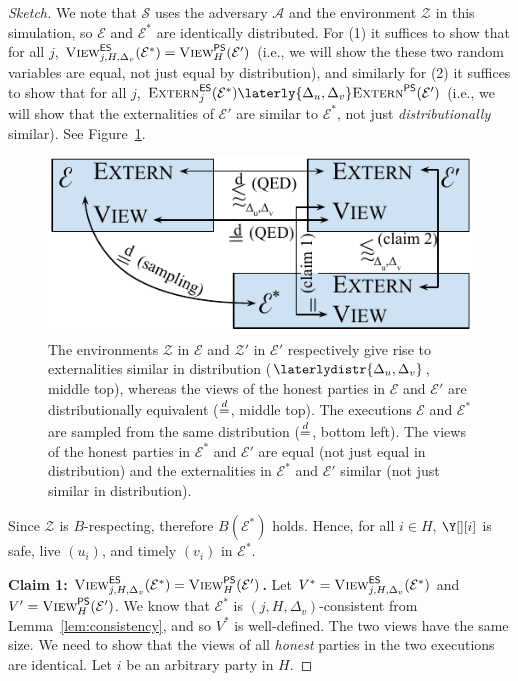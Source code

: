 \begin{proof}[Sketch]

  We note that $\mathcal{S}$ uses the adversary $\mathcal{A}$ and the
  environment $\mathcal{Z}$ in this simulation, so $\mathcal{E}$
  and $\mathcal{E}^*$ are identically distributed.
  For (1) it suffices to show that for all $j$,
  $\textsc{View}^{\textsf{ES}}_{j,H,\Delta_v}(\mathcal{E}^*) = \textsc{View}^{\textsf{PS}}_H(\mathcal{E}')$
  (i.e., we will show the these two random variables are equal,
  not just equal by distribution),
  and similarly for (2) it suffices to show that for all $j$,
  $\LCExtern_j(\mathcal{E}^*) \laterly{\Delta_u,\Delta_v} \PEExtern(\mathcal{E}')$
  (i.e., we will show that the externalities of $\mathcal{E}'$ are
  similar to $\mathcal{E}^*$, not just \emph{distributionally} similar).
  See Figure~\ref{fig.emulation-distribution}.

  \begin{figure}
    \centering
    \includegraphics[width=0.6 \textwidth,keepaspectratio]{figures/rollerblade-emulation-distribution.pdf}
    \caption{The environments $\mathcal{Z}$ in $\mathcal{E}$ and $\mathcal{Z}'$
    in $\mathcal{E}'$ respectively
    give rise to externalities similar in distribution ($\laterlydistr{\Delta_u,\Delta_v}$,
    middle top),
    whereas the views of the honest parties in $\mathcal{E}$
    and $\mathcal{E}'$ are distributionally equivalent ($\distreq$, middle top).
    The executions $\mathcal{E}$ and $\mathcal{E}^*$ are sampled
    from the same distribution ($\distreq$, bottom left).
    The views of the honest parties in $\mathcal{E}^*$ and $\mathcal{E}'$
    are equal (not just equal in distribution)
    and the externalities in $\mathcal{E}^*$ and $\mathcal{E}'$
    similar (not just similar in distribution).}
    \label{fig.emulation-distribution}
  \end{figure}

  Since $\mathcal{Z}$ is $B$-respecting, therefore $B(\mathcal{E}^*)$ holds.
  Hence, for all $i \in H$, $\Y[][i]$ is safe, live $(u_i)$, and timely $(v_i)$
  in $\mathcal{E}^*$.

  \noindent
  \textbf{Claim 1: $\textsc{View}^{\textsf{ES}}_{j,H,\Delta_v}(\mathcal{E}^*) = \textsc{View}^{\textsf{PS}}_H(\mathcal{E}')$.}
  Let $V^* = \textsc{View}^{\textsf{ES}}_{j,H,\Delta_v}(\mathcal{E}^*)$ and
  $V' = \textsc{View}^{\textsf{PS}}_H(\mathcal{E}')$.
  We know that $\mathcal{E}^*$ is $(j, H, \Delta_v)$-consistent
  from Lemma~\ref{lem:consistency}, and so $V^*$
  is well-defined.
  The two views have the same size.
  We need to show
  that the views of all \emph{honest} parties in the two executions are identical.
  Let $i$ be an arbitrary party in $H$.


\end{proof}
